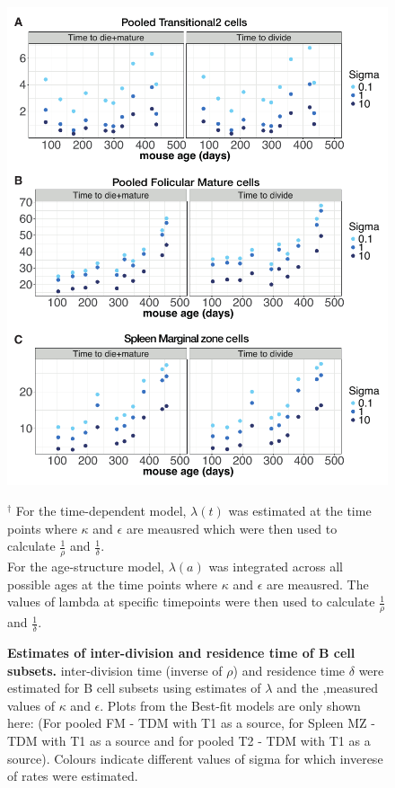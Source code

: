 \documentclass[11pt]{article}
\begin{document}
\begin{figure}[h!]
	\centerline{\includegraphics[scale = 1.1] {rate_estimates.pdf}}
	\caption{\small \textbf{Estimates of inter-division and residence time of B cell subsets.}  inter-division time (inverse of $\rho$) and residence time $\delta$ were estimated for B cell subsets using estimates of $\lambda$ and the ,measured values of $\kappa$ and $\epsilon$. Plots from the Best-fit models are only shown here: (For pooled FM - TDM with T1 as a source, for Spleen MZ - TDM with T1 as a source and for pooled T2 - TDM with T1 as a source). Colours indicate different values of sigma for which inverese of rates were estimated.}
	$^{\dagger}$ \footnotesize{For the time-dependent model, $\lambda(t)$ was estimated at the time points where $\kappa$ and $\epsilon$ are meausred which were then used to calculate $\frac{1}{\rho}$ and $\frac{1}{\delta}$.\\
	For the age-structure model, $\lambda(a)$ was integrated across all possible ages at the time points where $\kappa$ and $\epsilon$ are meausred. The values of lambda at specific timepoints were then used to calculate $\frac{1}{\rho}$ and $\frac{1}{\delta}$.}
	\label{fig:rates}
\end{figure}
\end{document}
